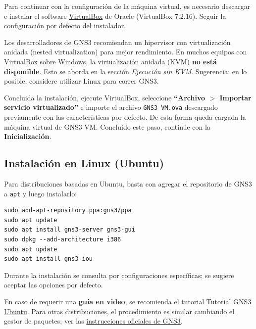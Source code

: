 \documentclass[letterpaper,12pt]{article}
\begin{document}
Para continuar con la configuración de la máquina virtual, es necesario descargar e instalar el software \href{https://www.virtualbox.org/wiki/Downloads}{VirtualBox} de Oracle (VirtualBox 7.2.16). Seguir la configuración por defecto del instalador.

\begin{nota}
Los desarrolladores de GNS3 recomiendan un hipervisor con virtualización anidada (nested virtualization) para mejor rendimiento. En muchos equipos con VirtualBox sobre Windows, la virtualización anidada (KVM\footnotemark) \textbf{no está disponible}. Esto se aborda en la sección \textit{Ejecución sin KVM}. Sugerencia: en lo posible, considere utilizar Linux para correr GNS3.
\end{nota}

Concluida la instalación, ejecute VirtualBox, seleccione \textbf{``Archivo $>$ Importar servicio virtualizado''} e importe el archivo \texttt{GNS3 VM.ova} descargado previamente con las características por defecto. De esta forma queda cargada la máquina virtual de GNS3 VM. Concluido este paso, continúe con la \textbf{Inicialización}.

\subsection{Instalación en Linux (Ubuntu)}

Para distribuciones basadas en Ubuntu, basta con agregar el repositorio de GNS3 a \texttt{apt} y luego instalarlo:

\begin{lstlisting}
sudo add-apt-repository ppa:gns3/ppa
sudo apt update
sudo apt install gns3-server gns3-gui
sudo dpkg --add-architecture i386
sudo apt update
sudo apt install gns3-iou
\end{lstlisting}

\begin{nota}
Durante la instalación se consulta por configuraciones específicas; se sugiere aceptar las opciones por defecto.
\end{nota}

En caso de requerir una \textbf{guía en video}, se recomienda el tutorial \href{https://www.youtube.com/watch?v=PBdHzJOi1Tc}{Tutorial GNS3 Ubuntu}. Para otras distribuciones, el procedimiento es similar cambiando el gestor de paquetes; ver las \href{https://docs.gns3.com/docs/getting-started/installation/linux/}{instrucciones oficiales de GNS3}.
\end{document}
